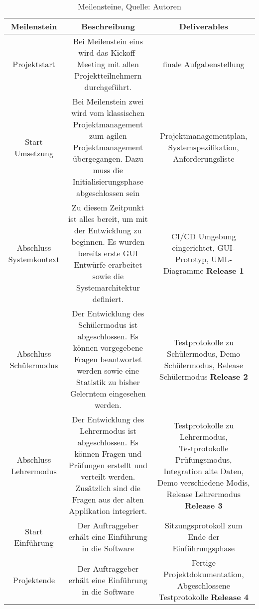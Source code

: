 \begin{table}[H]
\setlength\extrarowheight{2pt} %
\begin{tabularx}{\textwidth}{|C|C|C|}
\hline
\textbf{Meilenstein} &  \textbf{Beschreibung} & \textbf{Deliverables}  \\

\hline
Projektstart & Bei Meilenstein eins wird das Kickoff-Meeting mit allen Projektteilnehmern durchgeführt. & finale Aufgabenstellung\\

\hline
Start Umsetzung & Bei Meilenstein zwei wird vom klassischen Projektmanagement zum agilen Projektmanagement übergegangen. Dazu muss die Initialisierungsphase abgeschlossen sein& Projektmanagementplan, Systemspezifikation, Anforderungsliste\\

\hline
Abschluss Systemkontext & Zu diesem Zeitpunkt ist alles bereit, um mit der Entwicklung zu beginnen. Es wurden bereits erste GUI Entwürfe erarbeitet sowie die Systemarchitektur definiert.  & CI/CD Umgebung eingerichtet, GUI-Prototyp, UML-Diagramme  
\newline \textbf{Release 1}
\\

\hline
Abschluss Schülermodus & Der Entwicklung des Schülermodus ist abgeschlossen. Es können vorgegebene Fragen beantwortet werden sowie eine Statistik zu bisher Gelerntem eingesehen werden.  & Testprotokolle zu Schülermodus, Demo Schülermodus, Release Schülermodus 
\newline
\textbf{Release 2}
 \\

\hline
Abschluss Lehrermodus & Der Entwicklung des Lehrermodus ist abgeschlossen. Es können Fragen und Prüfungen erstellt und verteilt werden. Zusätzlich sind die Fragen aus der alten Applikation integriert. & Testprotokolle zu Lehrermodus, Testprotokolle Prüfungsmodus, Integration alte Daten, Demo verschiedene Modis, Release Lehrermodus  
\newline
\textbf {Release 3}
\\

\hline
Start Einführung & Der Auftraggeber erhält eine Einführung in die Software & Sitzungsprotokoll zum Ende der Einführungsphase  
\\

\hline
Projektende & Der Auftraggeber erhält eine Einführung in die Software & Fertige Projektdokumentation, Abgeschlossene Testprotokolle   
\newline
\textbf{Release 4}
\\
\hline
\end{tabularx}
\caption{ \label{tbl: Meilensteine}Meilensteine, Quelle: Autoren}
\end{table}
\newpage
